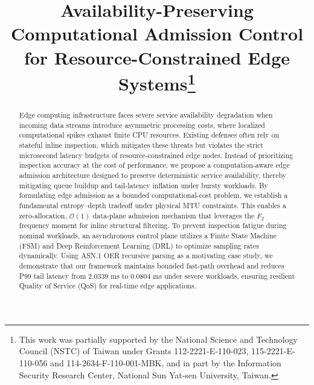 \documentclass[conference]{IEEEtran}
\begin{document}
\title{Availability-Preserving Computational Admission Control for Resource-Constrained Edge Systems\thanks{This work was partially supported by the National Science and Technology Council (NSTC) of Taiwan under Grants 112-2221-E-110-023, 115-2221-E-110-056 and 114-2634-F-110-001-MBK, and in part by the Information Security Research Center, National Sun Yat-sen University, Taiwan.}}

\author{
}

\maketitle

\begin{abstract}
Edge computing infrastructure faces severe service availability degradation when incoming data streams introduce asymmetric processing costs, where localized computational spikes exhaust finite CPU resources. Existing defenses often rely on stateful inline inspection, which mitigates these threats but violates the strict microsecond latency budgets of resource-constrained edge nodes. Instead of prioritizing inspection accuracy at the cost of performance, we propose a computation-aware edge admission architecture designed to preserve deterministic service availability, thereby mitigating queue buildup and tail-latency inflation under bursty workloads. By formulating edge admission as a bounded computational-cost problem, we establish a fundamental entropy--depth tradeoff under physical MTU constraints. This enables a zero-allocation, $\mathcal{O}(1)$ data-plane admission mechanism that leverages the $F_2$ frequency moment for inline structural filtering. To prevent inspection fatigue during nominal workloads, an asynchronous control plane utilizes a Finite State Machine (FSM) and Deep Reinforcement Learning (DRL) to optimize sampling rates dynamically. Using ASN.1 OER recursive parsing as a motivating case study, we demonstrate that our framework maintains bounded fast-path overhead and reduces P99 tail latency from 2.0339 ms to 0.0804 ms under severe workloads, ensuring resilient Quality of Service (QoS) for real-time edge applications.
\end{abstract}
\end{document}
